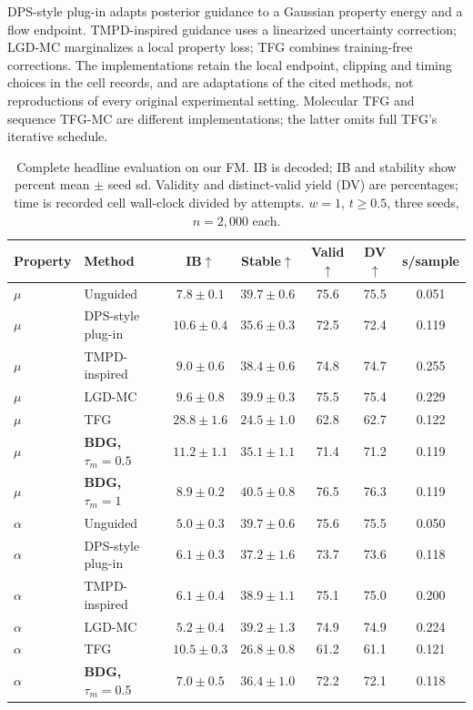 \documentclass{article}
\begin{document}
DPS-style plug-in adapts posterior guidance to a Gaussian property energy and a flow endpoint. TMPD-inspired guidance uses a linearized uncertainty correction; LGD-MC marginalizes a local property loss; TFG combines training-free corrections. The implementations retain the local endpoint, clipping and timing choices in the cell records, and are adaptations of the cited methods, not reproductions of every original experimental setting. Molecular TFG and sequence TFG-MC are different implementations; the latter omits full TFG's iterative schedule.
\begin{table}[!htbp]
\centering\small
\caption{Complete headline evaluation on our FM. IB is decoded; IB and stability show percent mean $\pm$ seed sd. Validity and distinct-valid yield (DV) are percentages; time is recorded cell wall-clock divided by attempts. $w=1$, $t\ge0.5$, three seeds, $n=2{,}000$ each.}
\label{tab:full-fm}
\begin{tabular}{llccccc}
\toprule
Property & Method & IB$\uparrow$ & Stable$\uparrow$ & Valid$\uparrow$ & DV$\uparrow$ & s/sample\\
\midrule
$\mu$ & Unguided & $7.8\pm0.1$ & $39.7\pm0.6$ & 75.6 & 75.5 & 0.051\\
$\mu$ & DPS-style plug-in & $10.6\pm0.4$ & $35.6\pm0.3$ & 72.5 & 72.4 & 0.119\\
$\mu$ & TMPD-inspired & $9.0\pm0.6$ & $38.4\pm0.6$ & 74.8 & 74.7 & 0.255\\
$\mu$ & LGD-MC & $9.6\pm0.8$ & $39.9\pm0.3$ & 75.5 & 75.4 & 0.229\\
$\mu$ & TFG & $28.8\pm1.6$ & $24.5\pm1.0$ & 62.8 & 62.7 & 0.122\\
$\mu$ & \textbf{BDG, $\tau_m=0.5$} & $11.2\pm1.1$ & $35.1\pm1.1$ & 71.4 & 71.2 & 0.119\\
$\mu$ & \textbf{BDG, $\tau_m=1$} & $8.9\pm0.2$ & $40.5\pm0.8$ & 76.5 & 76.3 & 0.119\\
\midrule
$\alpha$ & Unguided & $5.0\pm0.3$ & $39.7\pm0.6$ & 75.6 & 75.5 & 0.050\\
$\alpha$ & DPS-style plug-in & $6.1\pm0.3$ & $37.2\pm1.6$ & 73.7 & 73.6 & 0.118\\
$\alpha$ & TMPD-inspired & $6.1\pm0.4$ & $38.9\pm1.1$ & 75.1 & 75.0 & 0.200\\
$\alpha$ & LGD-MC & $5.2\pm0.4$ & $39.2\pm1.3$ & 74.9 & 74.9 & 0.224\\
$\alpha$ & TFG & $10.5\pm0.3$ & $26.8\pm0.8$ & 61.2 & 61.1 & 0.121\\
$\alpha$ & \textbf{BDG, $\tau_m=0.5$} & $7.0\pm0.5$ & $36.4\pm1.0$ & 72.2 & 72.1 & 0.118\\

\end{tabular}
\end{table}
\end{document}
